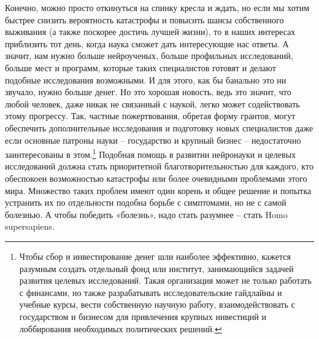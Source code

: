 \documentclass[12pt,a4paper]{report}
\begin{document}
\noindent Конечно, можно просто откинуться на спинку кресла и ждать, но если мы хотим быстрее снизить вероятность катастрофы и повысить шансы собственного выживания (а также поскорее достичь лучшей жизни), то в наших интересах приблизить тот день, когда наука сможет дать интересующие нас ответы. А значит, нам нужно больше нейроученых, больше профильных исследований, больше мест и программ, которые таких специалистов готовят и делают подобные исследования возможными. И для этого, как бы банально это ни звучало, нужно больше денег. Но это хорошая новость, ведь это значит, что любой человек, даже никак не связанный с наукой, легко может содействовать этому прогрессу. Так, частные пожертвования, обретая форму грантов, могут обеспечить дополнительные исследования и подготовку новых специалистов даже если основные патроны науки -- государство и крупный бизнес -- недостаточно заинтересованы в этом.\footnote{Чтобы сбор и инвестирование денег шли наиболее эффективно, кажется разумным создать отдельный фонд или институт, занимающийся задачей развития целевых исследований. Такая организация может не только работать с финансами, но также разрабатывать исследовательские гайдлайны и учебные курсы, вести собственную научную работу, взаимодействовать с государством и бизнесом для привлечения крупных инвестиций и лоббирования необходимых политических решений.} Подобная помощь в развитии нейронауки и целевых исследований должна стать приоритетной благотворительностью для каждого, кто обеспокоен возможностью катастрофы или более очевидными проблемами этого мира. Множество таких проблем имеют один корень и общее решение и попытка устранить их по отдельности подобна борьбе с симптомами, но не с самой болезнью. А чтобы победить «болезнь», надо стать разумнее -- стать Homo supersapiens.
\end{document}
